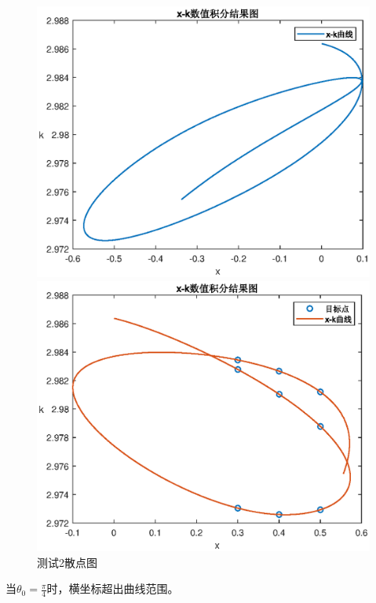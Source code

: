 \documentclass[withoutpreface,bwprint]{cumcmthesis}
\begin{document}
\begin{figure}[!h]  
\centering  
\begin{minipage}{.5\textwidth}  
  \centering  
  \includegraphics[width=.9\linewidth]{Q1x-k2+45.eps}  
\end{minipage}%
\begin{minipage}{.5\textwidth}  
  \centering  
  \includegraphics[width=.9\linewidth]{Q1x-k2.eps}  
\end{minipage}  
\caption{测试2散点图}  
\end{figure}  


当$\theta_0=\frac{\pi}{4}$时，横坐标超出曲线范围。
\end{document}
